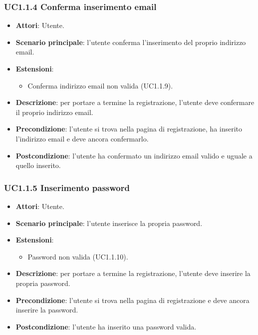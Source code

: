 \subsubsection{UC1.1.4 Conferma inserimento email}
\begin{itemize}
\item \textbf{Attori}: Utente.
\item \textbf{Scenario principale}: l'utente conferma l'inserimento del proprio indirizzo email.
\item \textbf{Estensioni}:
\begin{itemize}
\item Conferma indirizzo email non valida (UC1.1.9).
\end{itemize}
\item \textbf{Descrizione}: per portare a termine la registrazione, l'utente deve confermare il proprio indirizzo email.
\item \textbf{Precondizione}: l'utente si trova nella pagina di registrazione, ha inserito l'indirizzo email e deve ancora confermarlo.
\item \textbf{Postcondizione}: l'utente ha confermato un indirizzo email valido e uguale a quello inserito.
\end{itemize}
\subsubsection{UC1.1.5 Inserimento password}
\begin{itemize}
\item \textbf{Attori}: Utente.
\item \textbf{Scenario principale}: l'utente inserisce la propria password.
\item \textbf{Estensioni}:
\begin{itemize}
\item Password non valida (UC1.1.10).
\end{itemize}
\item \textbf{Descrizione}: per portare a termine la registrazione, l'utente deve inserire la propria password.
\item \textbf{Precondizione}: l'utente si trova nella pagina di registrazione e deve ancora inserire la password.
\item \textbf{Postcondizione}: l'utente ha inserito una password valida.
\end{itemize}
